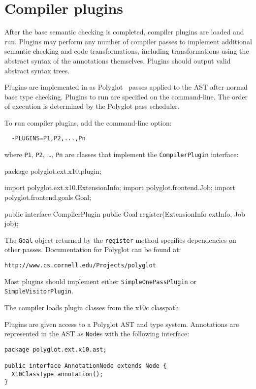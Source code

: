 \section{Compiler plugins}

After the base \Xten{} semantic checking is completed, 
compiler plugins are loaded and run.  Plugins may perform
any number of compiler passes to implement
additional semantic checking and code transformations, including
transformations using the abstract syntax of the annotations
themselves.  Plugins should output valid \Xten{} abstract
syntax trees.

Plugins are implemented in \Java{} as
Polyglot~\cite{ncm03} passes applied to the AST
after normal base \Xten{} type checking.
Plugins to run are specified on the command-line.  The order of
execution is determined by the Polyglot pass scheduler.

To run compiler plugins, add the command-line option:
\begin{verbatim}
  -PLUGINS=P1,P2,...,Pn
\end{verbatim}
where \texttt{P1}, \texttt{P2}, \dots, \texttt{Pn} are classes that implement the
\texttt{CompilerPlugin} interface:

\begin{xten}
package polyglot.ext.x10.plugin;

import polyglot.ext.x10.ExtensionInfo;
import polyglot.frontend.Job;
import polyglot.frontend.goals.Goal;

public interface CompilerPlugin {
  public Goal
    register(ExtensionInfo extInfo, Job job);
}
\end{xten}

The \texttt{Goal} object returned by the \texttt{register} method specifies dependencies on other passes.
Documentation for Polyglot can be found at:
\begin{verbatim}
http://www.cs.cornell.edu/Projects/polyglot
\end{verbatim}
Most plugins should implement either \texttt{SimpleOnePassPlugin} or
\texttt{SimpleVisitorPlugin}.

The compiler loads plugin classes from the x10c classpath.

Plugins are given access to a Polyglot AST and type system.  Annotations are
represented in the AST as \texttt{Node}s with the following interface:

\begin{verbatim}
package polyglot.ext.x10.ast;

public interface AnnotationNode extends Node {
  X10ClassType annotation();
}
\end{verbatim}

